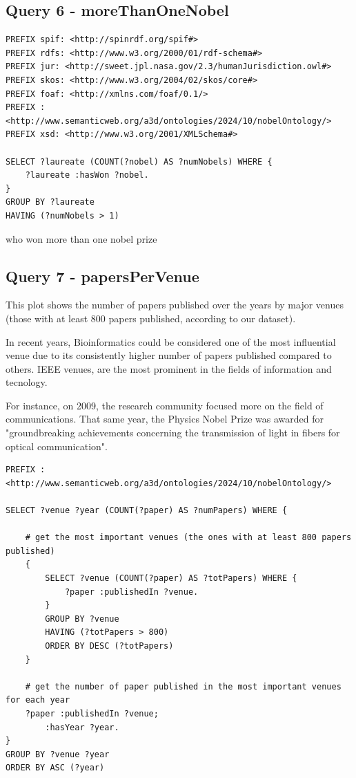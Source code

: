 \documentclass{article}
\begin{document}
\subsection*{Query 6 - moreThanOneNobel}

\begin{lstlisting}
PREFIX spif: <http://spinrdf.org/spif#>
PREFIX rdfs: <http://www.w3.org/2000/01/rdf-schema#>
PREFIX jur: <http://sweet.jpl.nasa.gov/2.3/humanJurisdiction.owl#>
PREFIX skos: <http://www.w3.org/2004/02/skos/core#>
PREFIX foaf: <http://xmlns.com/foaf/0.1/>
PREFIX : <http://www.semanticweb.org/a3d/ontologies/2024/10/nobelOntology/>
PREFIX xsd: <http://www.w3.org/2001/XMLSchema#>

SELECT ?laureate (COUNT(?nobel) AS ?numNobels) WHERE {
    ?laureate :hasWon ?nobel.
}
GROUP BY ?laureate
HAVING (?numNobels > 1)    
\end{lstlisting}

who won more than one nobel prize

\subsection*{Query 7 - papersPerVenue}
This plot shows the number of papers published over the years by major
venues (those with at least 800 papers published, according to our dataset).

In recent years, Bioinformatics could be considered one of the most influential
venue due to its consistently higher number of papers published compared to others.
IEEE venues, are the most prominent in the fields of information and tecnology.

For instance, on 2009, the research community focused more on the field of
communications.
That same year, the Physics Nobel Prize was awarded for "groundbreaking achievements
concerning the transmission of light in fibers for optical communication".

\begin{lstlisting}
PREFIX : <http://www.semanticweb.org/a3d/ontologies/2024/10/nobelOntology/>

SELECT ?venue ?year (COUNT(?paper) AS ?numPapers) WHERE {

    # get the most important venues (the ones with at least 800 papers published)
    {
        SELECT ?venue (COUNT(?paper) AS ?totPapers) WHERE {
            ?paper :publishedIn ?venue.
        }
        GROUP BY ?venue
        HAVING (?totPapers > 800)
        ORDER BY DESC (?totPapers)
    }

    # get the number of paper published in the most important venues for each year
    ?paper :publishedIn ?venue;
        :hasYear ?year.
}
GROUP BY ?venue ?year
ORDER BY ASC (?year)    
\end{lstlisting}
\end{document}
